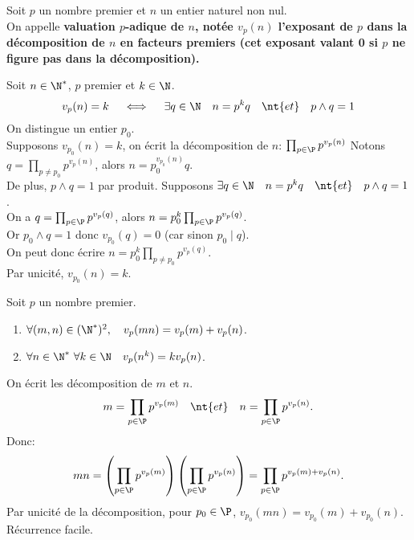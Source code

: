 \documentclass[11pt]{article}
\begin{document}
\begin{defi}{}{}
    Soit $p$ un nombre premier et $n$ un entier naturel non nul.\\
    On appelle \bf{valuation $p$-adique} de $n$, notée $v_p(n)$ l'exposant de $p$ dans la décomposition de $n$ en facteurs premiers (cet exposant valant 0 si $p$ ne figure pas dans la décomposition).
\end{defi}

\pagebreak

\begin{prop}{}{}
    Soit $n\in\N^*$, $p$ premier et $k\in\N$.
    \begin{equation*}
        v_p(n) = k \quad \iff \quad \exists q \in \N \quad n=p^kq \quad \nt{et} \quad p \land q = 1
    \end{equation*}
    \tcblower
    On distingue un entier $p_0$.\\
    \fbox{$\ra$} Supposons $v_{p_0}(n)=k$, on écrit la décomposition de $n$: $\prod_{p\in\P}p^{v_p(n)}$
    Notons $q=\prod_{p\neq p_0}p^{v_p(n)}$, alors $n=p_0^{v_{p_0}(n)}q$.\\
    De plus, $p\land q=1$ par produit.\n
    \fbox{$\la$} Supposons $\exists q \in \N\quad n=p^kq\quad\nt{et}\quad p\land q=1$.\\
    On a $q=\prod_{p\in\P}p^{v_p(q)}$, alors $n=p_0^k\prod_{p\in\P}p^{v_p(q)}$.\\
    Or $p_0\land q = 1$ donc $v_{p_0}(q)=0$ (car sinon $p_0\mid q$).\\
    On peut donc écrire $n=p_0^k\prod_{p\neq p_0}p^{v_p(q)}$.\\
    Par unicité, $v_{p_0}(n)=k$.
\end{prop}

\begin{prop}{}{}
    Soit $p$ un nombre premier.
    \begin{enumerate}[topsep=0pt,itemsep=-0.9 ex]
        \item $\forall(m,n)\in(\N^*)^2,\quad v_p(mn)=v_p(m)+v_p(n)$.
        \item $\forall n \in \N^*~\forall k\in\N\quad v_p(n^k)=kv_p(n)$.
    \end{enumerate}
    \tcblower
     On écrit les décomposition de $m$ et $n$.
    \begin{equation*}
        m=\prod_{p\in\P}p^{v_p(m)} \quad \nt{et} \quad n=\prod_{p\in\P}p^{v_p(n)}.
    \end{equation*}
    Donc:
    \begin{equation*}
        mn=\left( \prod_{p\in\P}p^{v_p(m)} \right)\left( \prod_{p\in\P}p^{v_p(n)} \right) = \prod_{p\in\P}p^{v_p(m)+v_p(n)}.
    \end{equation*}
    Par unicité de la décomposition, pour $p_0\in\P$, $v_{p_0}(mn)=v_{p_0}(m)+v_{p_0}(n)$.\n
     Récurrence facile.
\end{prop}
\end{document}
